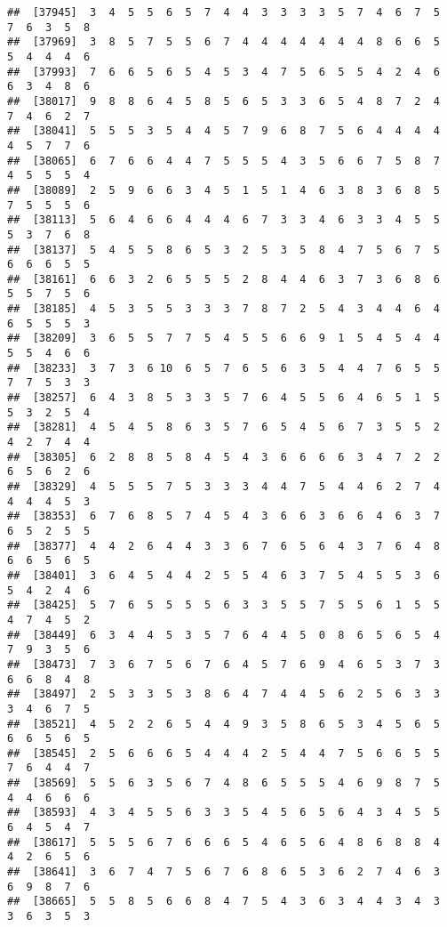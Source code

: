 \documentclass[
]{book}
\begin{document}
\begin{verbatim}
##  [37945]  3  4  5  5  6  5  7  4  4  3  3  3  3  5  7  4  6  7  5  7  6  3  5  8
##  [37969]  3  8  5  7  5  5  6  7  4  4  4  4  4  4  4  8  6  6  5  5  4  4  4  6
##  [37993]  7  6  6  5  6  5  4  5  3  4  7  5  6  5  5  4  2  4  6  6  3  4  8  6
##  [38017]  9  8  8  6  4  5  8  5  6  5  3  3  6  5  4  8  7  2  4  7  4  6  2  7
##  [38041]  5  5  5  3  5  4  4  5  7  9  6  8  7  5  6  4  4  4  4  4  5  7  7  6
##  [38065]  6  7  6  6  4  4  7  5  5  5  4  3  5  6  6  7  5  8  7  4  5  5  5  4
##  [38089]  2  5  9  6  6  3  4  5  1  5  1  4  6  3  8  3  6  8  5  7  5  5  5  6
##  [38113]  5  6  4  6  6  4  4  4  6  7  3  3  4  6  3  3  4  5  5  5  3  7  6  8
##  [38137]  5  4  5  5  8  6  5  3  2  5  3  5  8  4  7  5  6  7  5  6  6  6  5  5
##  [38161]  6  6  3  2  6  5  5  5  2  8  4  4  6  3  7  3  6  8  6  5  5  7  5  6
##  [38185]  4  5  3  5  5  3  3  3  7  8  7  2  5  4  3  4  4  6  4  6  5  5  5  3
##  [38209]  3  6  5  5  7  7  5  4  5  5  6  6  9  1  5  4  5  4  4  5  5  4  6  6
##  [38233]  3  7  3  6 10  6  5  7  6  5  6  3  5  4  4  7  6  5  5  7  7  5  3  3
##  [38257]  6  4  3  8  5  3  3  5  7  6  4  5  5  6  4  6  5  1  5  5  3  2  5  4
##  [38281]  4  5  4  5  8  6  3  5  7  6  5  4  5  6  7  3  5  5  2  4  2  7  4  4
##  [38305]  6  2  8  8  5  8  4  5  4  3  6  6  6  6  3  4  7  2  2  6  5  6  2  6
##  [38329]  4  5  5  5  7  5  3  3  3  4  4  7  5  4  4  6  2  7  4  4  4  4  5  3
##  [38353]  6  7  6  8  5  7  4  5  4  3  6  6  3  6  6  4  6  3  7  6  5  2  5  5
##  [38377]  4  4  2  6  4  4  3  3  6  7  6  5  6  4  3  7  6  4  8  6  6  5  6  5
##  [38401]  3  6  4  5  4  4  2  5  5  4  6  3  7  5  4  5  5  3  6  5  4  2  4  6
##  [38425]  5  7  6  5  5  5  5  6  3  3  5  5  7  5  5  6  1  5  5  4  7  4  5  2
##  [38449]  6  3  4  4  5  3  5  7  6  4  4  5  0  8  6  5  6  5  4  7  9  3  5  6
##  [38473]  7  3  6  7  5  6  7  6  4  5  7  6  9  4  6  5  3  7  3  6  6  8  4  8
##  [38497]  2  5  3  3  5  3  8  6  4  7  4  4  5  6  2  5  6  3  3  3  4  6  7  5
##  [38521]  4  5  2  2  6  5  4  4  9  3  5  8  6  5  3  4  5  6  5  6  6  5  6  5
##  [38545]  2  5  6  6  6  5  4  4  4  2  5  4  4  7  5  6  6  5  5  7  6  4  4  7
##  [38569]  5  5  6  3  5  6  7  4  8  6  5  5  5  4  6  9  8  7  5  4  4  6  6  6
##  [38593]  4  3  4  5  5  6  3  3  5  4  5  6  5  6  4  3  4  5  5  6  4  5  4  7
##  [38617]  5  5  5  6  7  6  6  6  5  4  6  5  6  4  8  6  8  8  4  4  2  6  5  6
##  [38641]  3  6  7  4  7  5  6  7  6  8  6  5  3  6  2  7  4  6  3  6  9  8  7  6
##  [38665]  5  5  8  5  6  6  8  4  7  5  4  3  6  3  4  4  3  4  3  3  6  3  5  3

\end{verbatim}
\end{document}
